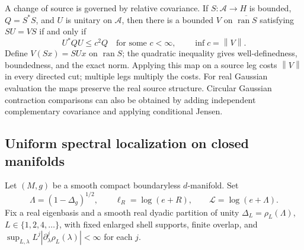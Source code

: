 \documentclass[11pt,a4paper]{amsart}
\numberwithin{equation}{section}
\theoremstyle{definition}
\theoremstyle{remark}
\DeclareMathOperator{\ran}{ran}
\newcommand{\norm}[1]{\left\lVert#1\right\rVert}
\begin{document}
A change of source is governed by relative covariance. If $S:\mathcal A\to H$ is bounded, $Q=S^*S$, and $U$ is unitary on $\mathcal A$, then there is a bounded $V$ on $\overline{\ran S}$ satisfying $SU=VS$ if and only if
\begin{equation}\label{eq:relativecovariance}
 U^*QU\le c^2Q\quad\text{for some }c<\infty,
 \qquad \inf c=\norm V.
\end{equation}
Define $V(Sx)=SUx$ on $\ran S$; the quadratic inequality gives well-definedness, boundedness, and the exact norm. Applying this map on a source leg costs $\norm V$ in every directed cut; multiple legs multiply the costs. For real Gaussian evaluation the maps preserve the real source structure. Circular Gaussian contraction comparisons can also be obtained by adding independent complementary covariance and applying conditional Jensen.

\subsection{Uniform spectral localization on closed manifolds}
Let $(M,g)$ be a smooth compact boundaryless $d$-manifold. Set
\[
 \Lambda=(1-\Delta_g)^{1/2},\qquad \ell_R=\log(e+R),\qquad
 \mathscr L=\log(e+\Lambda).
\]
Fix a real eigenbasis and a smooth real dyadic partition of unity $\Delta_L=\rho_L(\Lambda)$, $L\in\{1,2,4,\ldots\}$, with fixed enlarged shell supports, finite overlap, and
$\sup_{L,\lambda}L^j|\partial_\lambda^j\rho_L(\lambda)|<\infty$ for each $j$.
\end{document}
